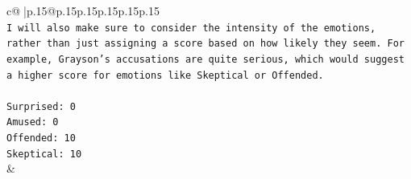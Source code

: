 \documentclass{article}
\begin{document}
{\begin{supertabular}{c@{$\;$}|p{.15\linewidth}@{}p{.15\linewidth}p{.15\linewidth}p{.15\linewidth}p{.15\linewidth}p{.15\linewidth}}
{{{\\ 
\texttt{I will also make sure to consider the intensity of the emotions, rather than just assigning a score based on how likely they seem. For example, Grayson's accusations are quite serious, which would suggest a higher score for emotions like Skeptical or Offended.} \\
\\ 
\texttt{Surprised: 0} \\
\texttt{Amused: 0} \\
\texttt{Offended: 10} \\
\texttt{Skeptical: 10} \\
            }
        }
    }
    & \\ \\

\end{supertabular}
}
\end{document}
